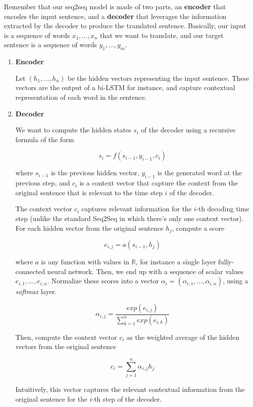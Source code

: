 \documentclass{tufte-handout}
\begin{document}
Remember that our seq2seq model is made of two parts, an \textbf{encoder} that encodes the input sentence, and a \textbf{decoder} that leverages the information extracted by the decoder to produce the translated sentence. Basically, our input is a sequence of words $ x_1, \ldots, x_n $ that we want to translate, and our target sentence is a sequence of words $ y_1, \ldots, y_m $.

\begin{enumerate}
\item \textbf{Encoder}

Let $ (h_1, \ldots, h_n) $ be the hidden vectors representing the input sentence. These vectors are the output of a bi-LSTM for instance, and capture contextual representation of each word in the sentence.
\item \textbf{Decoder}

We want to compute the hidden states $ s_i $ of the decoder using a recursive formula of the form

$$ s_i = f(s_{i-1}, y_{i-1}, c_i) $$

where $ s_{i-1} $ is the previous hidden vector, $ y_{i-1}$ is the generated word at the previous step, and $ c_i $ is a context vector that capture the context from the original sentence that is relevant to the time step $ i $ of the decoder.


The context vector $c_i$ captures relevant information for the $i$-th decoding time step (unlike the standard Seq2Seq in which there's only one context vector). For each hidden vector from the original sentence $ h_j $, compute a score

$$ e_{i,j} = a(s_{i-1}, h_j) $$

where $ a $ is any function with values in $ \mathbb{R}$, for instance a single layer fully-connected neural network. Then, we end up with a sequence of scalar values $ e_{i, 1}, \ldots, e_{i, n}$. Normalize these scores into a vector $ \alpha_i = (\alpha_{i,1}, \ldots, \alpha_{i,n}) $, using a \emph{softmax} layer.

$$ \alpha_{i,j} = \frac{exp(e_{i,j})}{\sum_{k=1}^n exp(e_{i,k})} $$

Then, compute the context vector $ c_i $ as the weighted average of the hidden vectors from the original sentence

$$ c_i = \sum_{j=1}^n \alpha_{i,j} h_j $$

Intuitively, this vector captures the relevant contextual information from the original sentence for the $i $-th step of the decoder.

\end{enumerate}
\end{document}
